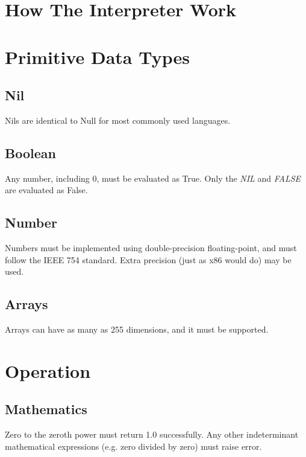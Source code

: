 \section{How The Interpreter Work}



\section{Primitive Data Types}

\subsection{Nil}
Nils are identical to Null for most commonly used languages.

\subsection{Boolean}
Any number, including 0, must be evaluated as True. Only the \emph{NIL} and \emph{FALSE} are evaluated as False.

\subsection{Number}
Numbers must be implemented using double-precision floating-point, and must follow the IEEE 754 standard. Extra precision (just as x86 would do) may be used.

\subsection{Arrays}
Arrays can have as many as 255 dimensions, and it must be supported.


\section{Operation}

\subsection{Mathematics}
Zero to the zeroth power must return 1.0 successfully. Any other indeterminant mathematical expressions (e.g. zero divided by zero) must raise  error.